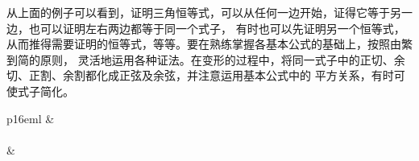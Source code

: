 从上面的例子可以看到，证明三角恒等式，可以从任何一边开始，证得它等于另一边，也可以证明左右两边都等于同一个式子，
有时也可以先证明另一个恒等式，从而推得需要证明的恒等式，等等。要在熟练掌握各基本公式的基础上，按照由繁到简的原则，
灵活地运用各种证法。在变形的过程中，将同一式子中的正切、余切、正割、余割都化成正弦及余弦，并注意运用基本公式中的
平方关系，有时可使式子简化。

\lianxi
\setcounter{cntxiaoti}{0}
\begin{xiaotis}

\begin{xiaoxiaotis}

    \begin{tabular}{p{16em}l}
         &  \\
         \\
         & 
    \end{tabular}
    
\end{xiaoxiaotis}

\begin{xiaoxiaotis}
    

    \vspace{0.5em}
    \vspace{0.5em}

\end{xiaoxiaotis}

\begin{xiaoxiaotis}



    \vspace{0.5em}
    \vspace{0.5em}


\end{xiaoxiaotis}

\end{xiaotis}
